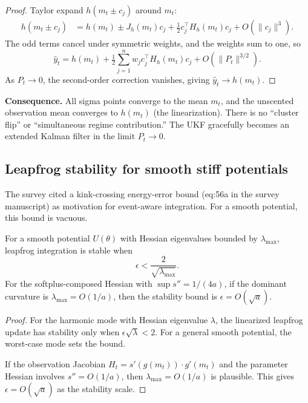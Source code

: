 \begin{proof}
Taylor expand $h(m_t \pm c_j)$ around $m_t$:
\begin{align*}
h(m_t \pm c_j) &= h(m_t) \pm J_h(m_t) c_j + \tfrac{1}{2} c_j^\top H_h(m_t) c_j + O(\|c_j\|^3).
\end{align*}
The odd terms cancel under symmetric weights, and the weights sum to one, so
\[
\hat{y}_t = h(m_t) + \tfrac{1}{2} \sum_{j=1}^n w_j c_j^\top H_h(m_t) c_j + O(\|P_t\|^{3/2}).
\]
As $P_t \to 0$, the second-order correction vanishes, giving $\hat{y}_t \to h(m_t)$.
\end{proof}

\textbf{Consequence.} All sigma points converge to the mean $m_t$, and the unscented observation mean converges to $h(m_t)$ (the linearization). There is no ``cluster flip'' or ``simultaneous regime contribution.'' The UKF gracefully becomes an extended Kalman filter in the limit $P_t \to 0$.


\subsection{Leapfrog stability for smooth stiff potentials}

The survey cited a kink-crossing energy-error bound (eq:56a in the survey manuscript) as motivation for event-aware integration. For a smooth potential, this bound is vacuous.

\begin{proposition}
\label{prop:leapfrog-stability}
For a smooth potential $U(\theta)$ with Hessian eigenvalues bounded by $\lambda_{\max}$, leapfrog integration is stable when
\begin{equation}\label{eq:leapfrog-stability}
\epsilon < \frac{2}{\sqrt{\lambda_{\max}}}.
\end{equation}
For the softplus-composed Hessian with $\sup s'' = 1/(4a)$, if the dominant curvature is $\lambda_{\max} = O(1/a)$, then the stability bound is $\epsilon = O(\sqrt{a})$.
\end{proposition}

\begin{proof}
For the harmonic mode with Hessian eigenvalue $\lambda$, the linearized leapfrog update has stability only when $\epsilon \sqrt{\lambda} < 2$. For a general smooth potential, the worst-case mode sets the bound.

If the observation Jacobian $H_t = s'(g(m_t)) \cdot g'(m_t)$ and the parameter Hessian involves $s'' = O(1/a)$, then $\lambda_{\max} = O(1/a)$ is plausible. This gives $\epsilon = O(\sqrt{a})$ as the stability scale.
\end{proof}

